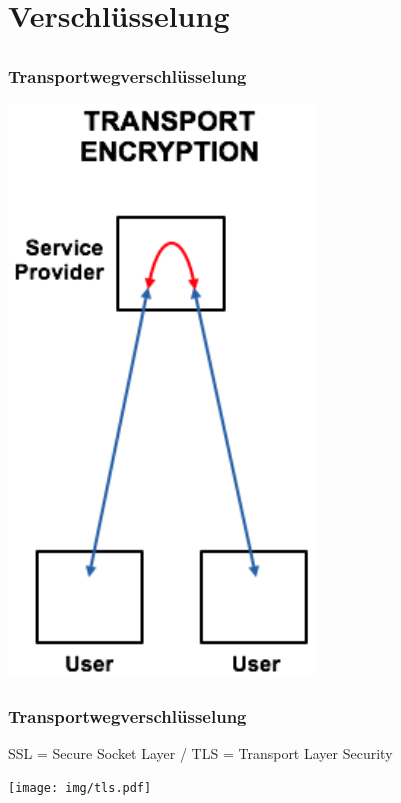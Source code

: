 \documentclass[12pt]{beamer}
\begin{document}
\section{Verschlüsselung}
\subsection{}

\begin{frame}
    \frametitle{Transportwegverschlüsselung}
    \begin{center}
      \includegraphics[height=0.8\textheight]{img/enc-transport.png}
    \end{center}
\end{frame}

\begin{frame}
    \frametitle{Transportwegverschlüsselung}
      SSL = Secure Socket Layer / TLS = Transport Layer Security
    \vfill
    \begin{center}
      \texttt{[image: img/tls.pdf]}
    \end{center}
\end{frame}
\end{document}
